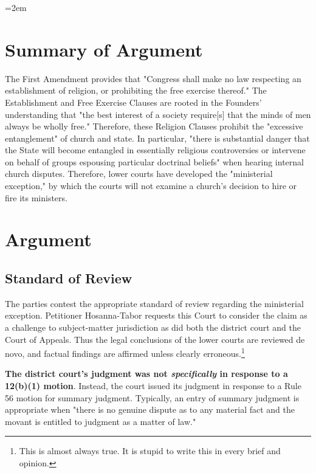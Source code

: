 \documentclass[12pt,\documentclassflag]{FRAP_Brief}
\author{Brendan Bernicker}
\begin{document}
\makefrontmatter

\parindent=2em
\setlength{\parskip}{1.25ex plus 2ex minus .5ex}

\section{Summary of Argument}

The First Amendment provides that "Congress shall make no law respecting an establishment of religion, or prohibiting the free exercise thereof." The Establishment and Free Exercise Clauses are rooted in the Founders' understanding that "the best interest of a society require[s] that the minds of men always be wholly free." Therefore, these Religion Clauses prohibit the "excessive entanglement" of church and state. In particular, "there is substantial danger that the State will become entangled in essentially religious controversies or intervene on behalf of groups espousing particular doctrinal beliefs" when hearing internal church disputes. Therefore, lower courts have developed the "ministerial exception," by which the courts will not examine a church's decision to hire or fire its ministers.  

\section{Argument}

\subsection{Standard of Review}

The parties contest the appropriate standard of review regarding the ministerial exception. Petitioner Hosanna-Tabor requests this Court to consider the claim as a challenge to subject-matter jurisdiction as did both the district court and the Court of Appeals. Thus the legal conclusions of the lower courts are reviewed de novo, and factual findings are affirmed unless clearly erroneous.\footnote{This is almost always true. It is stupid to write this in every brief and opinion.}

\textbf{The district court's judgment was not \textit{specifically} in response to a 12(b)(1) motion}. Instead, the court issued its judgment in response to a Rule 56 motion for summary judgment. Typically, an entry of summary judgment is appropriate when "there is no genuine dispute as to any material fact and the movant is entitled to judgment as a matter of law."
\end{document}
